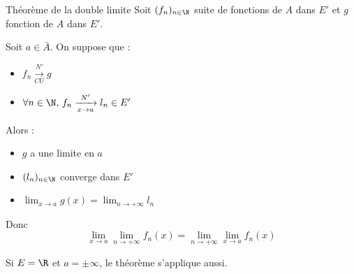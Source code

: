 \begin{theoreme}{Théorème de la double limite}{}
    Soit $(f_n)_{n \in \N}$ suite de fonctions de $A$ dans $E'$ et $g$ fonction de $A$ dans $E'$.

    Soit $a \in \bar A$. On suppose que : 
    \begin{itemize}
        \item $f_n \xrightarrow[CU]{N'} g$ 
        \item $\forall n \in \N, \, f_n \xrightarrow[x \to a]{N'} l_n \in E'$
    \end{itemize}

    Alors : 
    \begin{itemize}
        \item $g$ a une limite en $a$
        \item $(l_n)_{n \in \N}$ converge dans $E'$
        \item $\displaystyle \lim_{x \to a} g(x) = \lim_{n \to +\infty} l_n$
    \end{itemize}

    Donc $$\lim_{x \to a} \lim_{n \to +\infty} f_n(x) = \lim_{n \to +\infty} \lim_{x \to a} f_n(x)$$
\end{theoreme}

Si $E = \R$ et $a = \pm \infty$, le théorème s'applique aussi.


